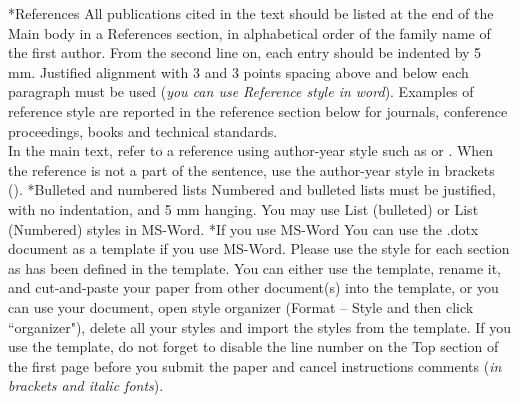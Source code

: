 \documentclass[twocolumn, a4paper,10pt]{article}
\makeatletter
\renewcommand\section{\@startsection{section}{1}{\z@}{3pt}{3pt}{\normalfont\large\bfseries}}
\renewcommand\subsection{\@startsection{subsection}{1}{\z@}{\z@}{\z@}{\normalfont\normalsize\bfseries}}
\renewcommand\subsection{\@startsection{subsection}{1}{\z@}{\z@}{0.1pt}{\normalfont\normalsize\bfseries}}
\makeatother
\begin{document}
\subsection*{References}
All publications cited in the text should be listed at the end of the Main body in a References section, in alphabetical order of the family name of the first author. From the second line on, each entry should be indented by 5 mm. Justified alignment with 3 and 3 points spacing above and below each paragraph must be used (\textit{you can use Reference style in word}). Examples of reference style are reported in the reference section below for journals, conference proceedings, books and technical standards.\\
In the main text, refer to a reference using author-year style such as \citet{Clarke2015:1} or \citet{ChuMajumdar2012}. When the reference is not a part of the sentence, use the author-year style in brackets (\cite{Clarke2015:1, ChuMajumdar2012,Monarim2014, BSDO2011, Mahdavi2011,iso52017}).
\subsection*{Bulleted and numbered lists}
Numbered and bulleted lists must be justified, with no indentation, and 5 mm hanging. You may use List (bulleted) or List (Numbered) styles in MS-Word. 
\section*{If you use MS-Word}
You can use the .dotx document as a template if you use MS-Word. Please use the style for each section as has been defined in the template. You can either use the template, rename it, and cut-and-paste your paper from other document(s) into the template, or you can use your document, open style organizer (Format – Style and then click ``organizer"), delete all your styles and import the styles from the template.
If you use the template, do not forget to disable the line number on the Top section of the first page before you submit the paper and cancel instructions comments (\textit{in brackets and italic fonts}).
\end{document}

